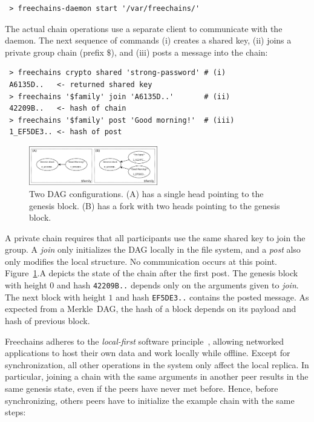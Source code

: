 \documentclass[10pt,journal,compsoc]{IEEEtran}
\newcommand{\FC}       {Freechains\xspace}
\begin{document}
{\footnotesize
\begin{verbatim}
 > freechains-daemon start '/var/freechains/'
\end{verbatim}
}

The actual chain operations use a separate client to communicate with the
daemon.
The next sequence of commands (i) creates a shared key, (ii) joins a private
group chain (prefix $\$$), and (iii) posts a message into the chain:

{\footnotesize
\begin{verbatim}
 > freechains crypto shared 'strong-password' # (i)
 A6135D..   <- returned shared key
 > freechains '$family' join 'A6135D..'       # (ii)
 42209B..   <- hash of chain
 > freechains '$family' post 'Good morning!'  # (iii)
 1_EF5DE3.. <- hash of post
\end{verbatim}
}

\begin{figure}
\centering
\includegraphics[width=0.5\textwidth]{family.png}
\caption{Two DAG configurations. (A) has a single head pointing to the
genesis block. (B) has a fork with two heads pointing to the genesis block.}
\label{fig.family}
\end{figure}

A private chain requires that all participants use the same shared key to join
the group.
A \emph{join} only initializes the DAG locally in the file system, and a
\emph{post} also only modifies the local structure.
No communication occurs at this point.
Figure~\ref{fig.family}.A depicts the state of the chain after the first post.
The genesis block with height $0$ and hash \texttt{42209B..}
depends only on the arguments given to \emph{join}.
The next block with height $1$ and hash \texttt{EF5DE3..} contains the posted
message.
As expected from a Merkle~DAG, the hash of a block depends on its payload and
hash of previous block.

\FC adheres to the \emph{local-first} software principle~\cite{p2p.local},
allowing networked applications to host their own data and work locally while
offline.
Except for synchronization, all other operations in the system only affect the
local replica.
In particular, joining a chain with the same arguments in another peer results
in the same genesis state, even if the peers have never met before.
Hence, before synchronizing, others peers have to initialize the example chain
with the same steps:
\end{document}
